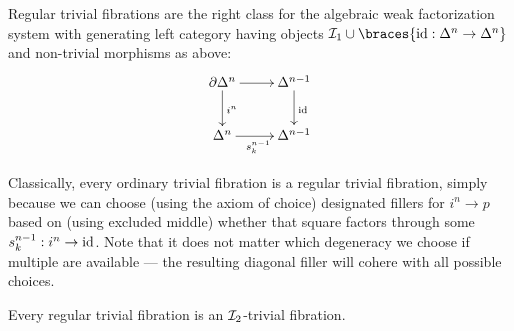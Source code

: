 \documentclass[reqno,10pt,a4paper,oneside]{amsart}
\begin{document}
Regular trivial fibrations are the right class for the algebraic weak factorization system with generating left category having objects $\cal{I}_1 \cup \braces{\id : \Delta^n \to \Delta^n}$ and non-trivial morphisms as above:
\[
\xymatrix{
  \partial \Delta^n
  \ar[r]
  \ar[d]^{i^n}
&
  \Delta^{n-1}
  \ar[d]^{\id}
\\
  \Delta^n
  \ar[r]_{s_k^{n-1}}
&
  \Delta^{n-1}
}
\]

Classically, every ordinary trivial fibration is a regular trivial fibration, simply because we can choose (using the axiom of choice) designated fillers for $i^n \to p$ based on (using excluded middle) whether that square factors through some $s_k^{n-1} : i^n \to \id$.
Note that it does not matter which degeneracy we choose if multiple are available --- the resulting diagonal filler will cohere with all possible choices.

\begin{lemma}
Every regular trivial fibration is an $\cal{I}_2$-trivial fibration.
\end{lemma}
\end{document}
